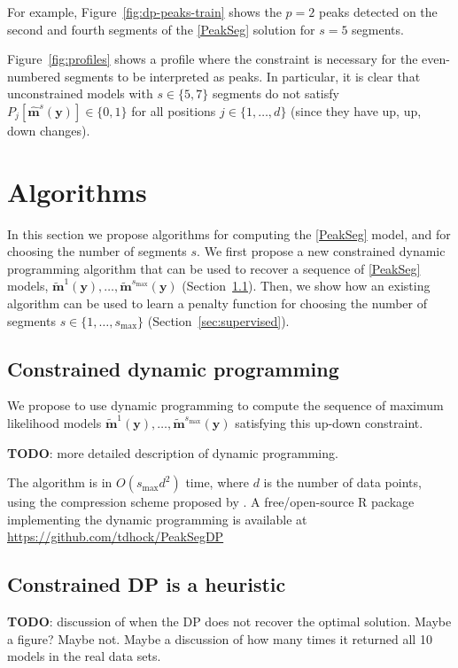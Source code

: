 \documentclass{article}
\begin{document}
For example, Figure~\ref{fig:dp-peaks-train} shows the $p=2$ peaks
detected on the second and fourth segments of the \ref{PeakSeg}
solution for $s=5$ segments.

Figure~\ref{fig:profiles} shows a profile where the constraint is
necessary for the even-numbered segments to be interpreted as
peaks. In particular, it is clear that unconstrained models with
$s\in\{5, 7\}$ segments do not satisfy $P_j[\mathbf{\hat m}^s(\mathbf
y)]\in\{0, 1\}$ for all positions $j\in\{1,\dots, d\}$ (since they
have up, up, down changes).

\section{Algorithms}
\label{sec:algorithms}

In this section we propose algorithms for computing the \ref{PeakSeg}
model, and for choosing the number of segments $s$. We first propose a
new constrained dynamic programming algorithm that can be used to
recover a sequence of \ref{PeakSeg} models, $\mathbf{\tilde
  m}^1(\mathbf y), \dots, \mathbf{\tilde m}^{s_{\text{max}}}(\mathbf
y)$ (Section~\ref{sec:constrained-dp}). Then, we show how an existing
algorithm can be used to learn a penalty function for choosing the
number of segments $s\in\{1, \dots, s_{\text{max}}\}$
(Section~\ref{sec:supervised}).

\subsection{Constrained dynamic programming}
\label{sec:constrained-dp}

We propose to use dynamic programming to compute the sequence of
maximum likelihood models $\mathbf{\tilde m}^1(\mathbf y), \dots,
\mathbf{\tilde m}^{s_{\text{max}}}(\mathbf y)$ satisfying this up-down
constraint.

\textbf{TODO}: more detailed description of dynamic programming.

The algorithm is in $O(s_{\text{max}} d^2)$ time, where $d$ is the
number of data points, using the compression scheme proposed by
\citet{Segmentor}. A free/open-source R package implementing the
dynamic
programming is available at\\
\url{https://github.com/tdhock/PeakSegDP}

\subsection{Constrained DP is a heuristic}
\label{sec:dp-fails}
\textbf{TODO}: discussion of when the DP does not recover the optimal
solution. Maybe a figure? Maybe not. Maybe a discussion of how many
times it returned all 10 models in the real data sets.
\end{document}
